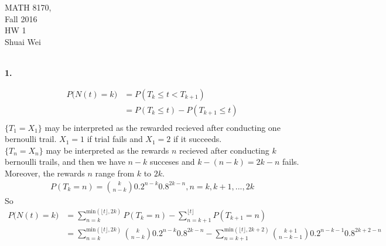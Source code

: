 \documentclass{amsart}
\theoremstyle{plain}
\theoremstyle{definition}
\begin{document}
\noindent MATH 8170,  \\
Fall 2016\\
HW 1\\
Shuai Wei \\
\
\textwidth 6.0in \oddsidemargin 0.0in

\noindent \textbf{1.} 

\begin{align*}
	P\big(N(t) = k\big)  &= P(T_k \leq t < T_{k+1}) \\
						&= P(T_k \leq t) - P(T_{k+1} \leq t) \\
\end{align*}
	$\{T_1 = X_1\}$ may be interpreted as the rewarded recieved after conducting one bernoulli trail. $X_1 = 1$ if trial fails and $X_1 = 2$ if it succeeds.\\
	$\{T_n = X_n\}$ may be interpreted as the rewards $n$ recieved after conducting $k$ bernoulli trails, and then we have $n-k$ succeses and $k-(n-k) = 2k-n$ fails. Moreover, the rewards $n$ range from $k$ to $2k$. \\
	\begin{align*}
		P(T_k = n)  = {k \choose {n-k}} 0.2^{n-k} 0.8^{2k-n}, n = k, k+1, ..., 2k 
	\end{align*}
 So
 	\begin{align*}
		P\big(N(t) = k\big) &= \sum_{n = k}^{\text{min}(\lfloor t\rfloor,2k)} P(T_k = n) - \sum_{n = k+1}^{\lfloor t\rfloor} P(T_{k+1} = n) \\
	   				  	  &= \sum_{n = k}^{\text{min}(\lfloor t\rfloor,2k)} {k \choose {n-k}} 0.2^{n-k} 0.8^{2k-n} - \sum_{n = k+1}^{\text{min}(\lfloor t\rfloor,2k+2)} {k+1 \choose {n-k-1}} 0.2^{n-k-1} 0.8^{2k+2-n} \\
 	\end{align*}
 
\vspace{5mm}
\end{document}
